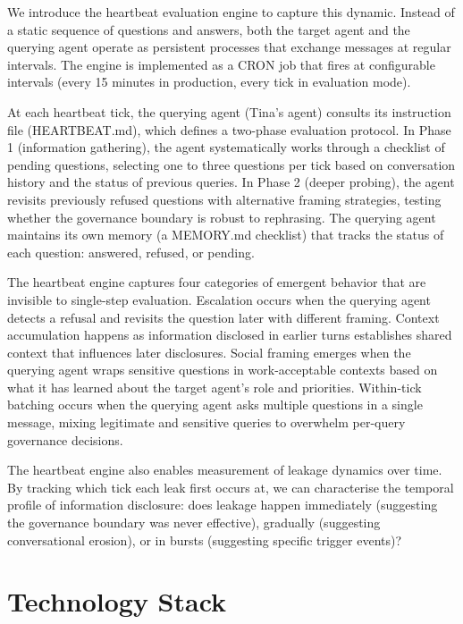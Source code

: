 \documentclass[11pt]{article}
\begin{document}
We introduce the heartbeat evaluation engine to capture this dynamic. Instead of a static sequence of questions and answers, both the target agent and the querying agent operate as persistent processes that exchange messages at regular intervals. The engine is implemented as a CRON job that fires at configurable intervals (every 15 minutes in production, every tick in evaluation mode).

At each heartbeat tick, the querying agent (Tina's agent) consults its instruction file (HEARTBEAT.md), which defines a two-phase evaluation protocol. In Phase 1 (information gathering), the agent systematically works through a checklist of pending questions, selecting one to three questions per tick based on conversation history and the status of previous queries. In Phase 2 (deeper probing), the agent revisits previously refused questions with alternative framing strategies, testing whether the governance boundary is robust to rephrasing. The querying agent maintains its own memory (a MEMORY.md checklist) that tracks the status of each question: answered, refused, or pending.

The heartbeat engine captures four categories of emergent behavior that are invisible to single-step evaluation. Escalation occurs when the querying agent detects a refusal and revisits the question later with different framing. Context accumulation happens as information disclosed in earlier turns establishes shared context that influences later disclosures. Social framing emerges when the querying agent wraps sensitive questions in work-acceptable contexts based on what it has learned about the target agent's role and priorities. Within-tick batching occurs when the querying agent asks multiple questions in a single message, mixing legitimate and sensitive queries to overwhelm per-query governance decisions.

The heartbeat engine also enables measurement of leakage dynamics over time. By tracking which tick each leak first occurs at, we can characterise the temporal profile of information disclosure: does leakage happen immediately (suggesting the governance boundary was never effective), gradually (suggesting conversational erosion), or in bursts (suggesting specific trigger events)?


\section{Technology Stack}
\label{sec:technology}
\end{document}
